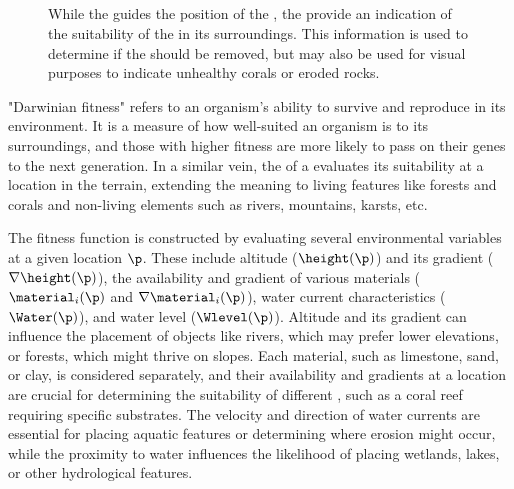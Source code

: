 \subsection{ }

\begin{figure}
    \caption{While the  guides the position of the , the  provide an indication of the suitability of the  in its surroundings. This information is used to determine if the  should be removed, but may also be used for visual purposes to indicate unhealthy corals or eroded rocks. }
\end{figure}

"Darwinian fitness" refers to an organism's ability to survive and reproduce in its environment. It is a measure of how well-suited an organism is to its surroundings, and those with higher fitness are more likely to pass on their genes to the next generation. In a similar vein, the  of a  evaluates its suitability at a location in the terrain, extending the meaning to living features like forests and corals and non-living elements such as rivers, mountains, karsts, etc.

The fitness function is constructed by evaluating several environmental variables at a given location $\p$. These include altitude ($\height(\p)$) and its gradient ($\nabla \height(\p)$), the availability and gradient of various materials ($\material_i(\p)$ and $\nabla \material_i(\p)$), water current characteristics ($\Water(\p)$), and water level ($\Wlevel(\p)$). Altitude and its gradient can influence the placement of objects like rivers, which may prefer lower elevations, or forests, which might thrive on slopes. Each material, such as limestone, sand, or clay, is considered separately, and their availability and gradients at a location are crucial for determining the suitability of different , such as a coral reef requiring specific substrates. The velocity and direction of water currents are essential for placing aquatic features or determining where erosion might occur, while the proximity to water influences the likelihood of placing wetlands, lakes, or other hydrological features.


